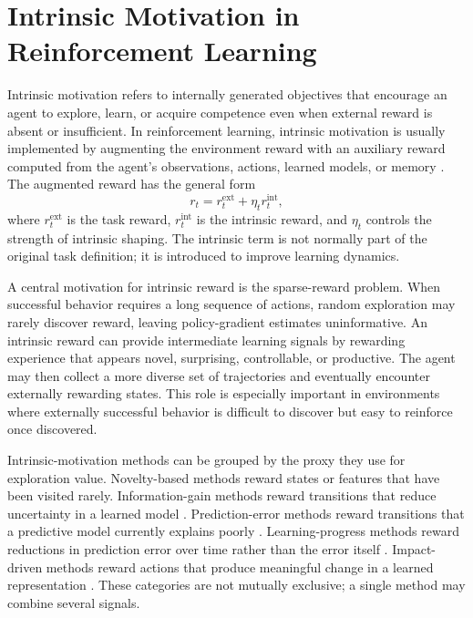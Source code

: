 \section{Intrinsic Motivation in Reinforcement Learning}
\label{sec:intrinsic_motivation_in_reinforcement_learning}

Intrinsic motivation refers to internally generated objectives that encourage an agent to explore, learn, or acquire competence even when external reward is absent or insufficient.
In reinforcement learning, intrinsic motivation is usually implemented by augmenting the environment reward with an auxiliary reward computed from the agent's observations, actions, learned models, or memory \parencite{singh-2004,barto-2012,oudeyer-2007A,oudeyer-2007B}.
The augmented reward has the general form
\begin{equation}
    r_t = r_t^{\mathrm{ext}} + \eta_t r_t^{\mathrm{int}},
\end{equation}
where $r_t^{\mathrm{ext}}$ is the task reward, $r_t^{\mathrm{int}}$ is the intrinsic reward, and $\eta_t$ controls the strength of intrinsic shaping.
The intrinsic term is not normally part of the original task definition; it is introduced to improve learning dynamics.

A central motivation for intrinsic reward is the sparse-reward problem.
When successful behavior requires a long sequence of actions, random exploration may rarely discover reward, leaving policy-gradient estimates uninformative.
An intrinsic reward can provide intermediate learning signals by rewarding experience that appears novel, surprising, controllable, or productive.
The agent may then collect a more diverse set of trajectories and eventually encounter externally rewarding states.
This role is especially important in environments where externally successful behavior is difficult to discover but easy to reinforce once discovered.

Intrinsic-motivation methods can be grouped by the proxy they use for exploration value.
Novelty-based methods reward states or features that have been visited rarely.
Information-gain methods reward transitions that reduce uncertainty in a learned model \parencite{houthooft-2016}.
Prediction-error methods reward transitions that a predictive model currently explains poorly \parencite{stadie-2015,pathak-2017}.
Learning-progress methods reward reductions in prediction error over time rather than the error itself \parencite{schmidhuber-1991,oudeyer-2007A,baranes-2009}.
Impact-driven methods reward actions that produce meaningful change in a learned representation \parencite{raileanu-2020}.
These categories are not mutually exclusive; a single method may combine several signals.

